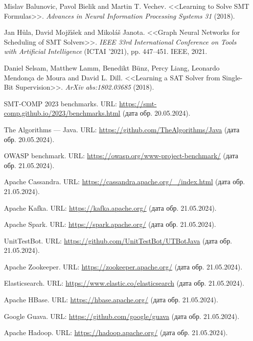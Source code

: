 \begin{thebibliography}{1}
 Mislav Balunovic, Pavol Bielik and Martin T. Vechev. <<Learning to Solve SMT Formulas>>. \textit{Advances in Neural Information Processing Systems 31} (2018).

 Jan H\r{u}la, David Moj\v{z}\'{\i}\v{s}ek and Mikol\'{a}\v{s} Janota. <<Graph Neural Networks for Scheduling of SMT Solvers>>. \textit{IEEE 33rd International Conference on Tools with Artificial Intelligence} (ICTAI '2021), pp. 447--451. IEEE, 2021.

 Daniel Selsam, Matthew Lamm, Benedikt B\"{u}nz, Percy Liang, Leonardo Mendonça de Moura and David L. Dill. <<Learning a SAT Solver from Single-Bit Supervision>>. \textit{ArXiv abs:1802.03685} (2018).

 SMT-COMP 2023 benchmarks. URL: \url{https://smt-comp.github.io/2023/benchmarks.html} (дата обр. 20.05.2024).

 The Algorithms --- Java. URL: \url{https://github.com/TheAlgorithms/Java} (дата обр. 20.05.2024).

 OWASP benchmark. URL: \url{https://owasp.org/www-project-benchmark/} (дата обр. 21.05.2024).

 Apache Cassandra. URL: \url{https://cassandra.apache.org/_/index.html} (дата обр. 21.05.2024).

 Apache Kafka. URL: \url{https://kafka.apache.org/} (дата обр. 21.05.2024).

 Apache Spark. URL: \url{https://spark.apache.org/} (дата обр. 21.05.2024).

 UnitTestBot. URL: \url{https://github.com/UnitTestBot/UTBotJava} (дата обр. 21.05.2024).

 Apache Zookeeper. URL: \url{https://zookeeper.apache.org/} (дата обр. 21.05.2024).

 Elasticsearch. URL: \url{https://www.elastic.co/elasticsearch} (дата обр. 21.05.2024).

 Apache HBase. URL: \url{https://hbase.apache.org/} (дата обр. 21.05.2024).

 Google Guava. URL: \url{https://github.com/google/guava} (дата обр. 21.05.2024).

 Apache Hadoop. URL: \url{https://hadoop.apache.org/} (дата обр. 21.05.2024).


\end{thebibliography}

